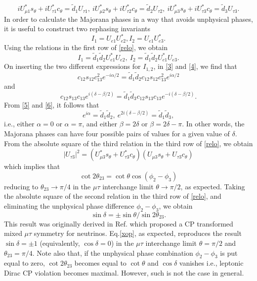 \documentclass[11pt]{article}
\begin{document}
\begin{equation}
iU^*_{\mu 1}s_\theta+iU^*_{\tau 1}c_\theta=\tilde{d}_1U_{\tau 1},~iU^*_{\mu 2}s_\theta+iU^*_{\tau 2}c_\theta=\tilde{d}_2U_{\tau 2},~iU^*_{\mu 3}s_\theta+iU^*_{\tau 3}c_\theta=\tilde{d}_3U_{\tau 3}.\label{relo}
\end{equation} In order to calculate the Majorana phases in a way that avoids unphysical phases, it is useful to construct two rephasing invariants\cite{Branco} \begin{equation}
I_1=U_{e1}U^*_{e2}, I_2=U_{e1}U^*_{e3}.\label{3}
\end{equation} Using the relations in the first row of \eqref{relo}, we obtain \begin{equation}
I_1=\tilde{d}_1\tilde{d}_2U^*_{e1}U_{e2},~ I_2=\tilde{d}_1\tilde{d}_2U^*_{e1}U_{e3}.\label{4}\end{equation} On inserting the two different expressions for $I_{1,2}$, in \eqref{3} and \eqref{4}, we find that \begin{equation}
c_{12}s_{12}c^2_{13}e^{-i\alpha/2}=\tilde{d}_1\tilde{d}_2 c_{12}s_{12}c^2_{13}e^{i\alpha/2}\label{5}
\end{equation} and \begin{equation}
c_{12}s_{13}c_{13}e^{i(\delta-\beta/2)}=\tilde{d}_1\tilde{d}_3 c_{12}s_{13}c_{13}e^{-i(\delta-\beta/2)}\label{6}.
\end{equation} From \eqref{5} and \eqref{6}, it follows that \begin{equation}
e^{i\alpha}=\tilde{d}_1\tilde{d}_2,~ e^{2i(\delta-\beta/2)}=\tilde{d}_1\tilde{d}_3,
\end{equation} i.e., either $\alpha=0$ or $\alpha=\pi$, and either $\beta=2\delta$ or $\beta=2\delta-\pi$. In other words, the Majorana phases can have four possible pairs of values for a given value of $\delta$. From the absolute square of the third relation in the third row of \eqref{relo}, we obtain \begin{equation}
|U_{\tau 3}|^2=(U^*_{\mu 3}s_\theta+U^*_{\tau 3}c_\theta)(U_{\mu 3}s_\theta+U_{\tau 3}c_\theta)\end{equation} which implies that\begin{equation}
\cot2\theta_{23}=\cot\theta\cos(\phi_2-\phi_3)
\end{equation} reducing to $\theta_{23}\to\pi/4$ in the $\mu\tau$ interchange limit $\theta\to\pi/2$, as expected. Taking the absolute square of the second relation in the third row of \eqref{relo}, and eliminating the unphysical phase difference $\phi_2-\phi_3$, we obtain\begin{equation}
\sin\delta=\pm\sin\theta/\sin2\theta_{23}.\label{xop}
\end{equation} This result was originally derived in Ref.\cite{Chen:2015siy} which proposed a CP transformed mixed $\mu\tau$ symmetry for neutrinos. Eq.\eqref{xop}, as expected, reproduces the result $\sin\delta=\pm 1$ (equivalently, $\cos\delta=0$) in the $\mu\tau$ interchange limit $\theta=\pi/2$ and $\theta_{23}=\pi/4$. Note also that, if the unphysical phase combination $\phi_2-\phi_3$ is put equal to zero, $\cot2\theta_{23}$ becomes equal to $\cot\theta$ and $\cos\delta$ vanishes i.e., leptonic Dirac CP violation becomes maximal. However, such is not the case in general.
\end{document}
